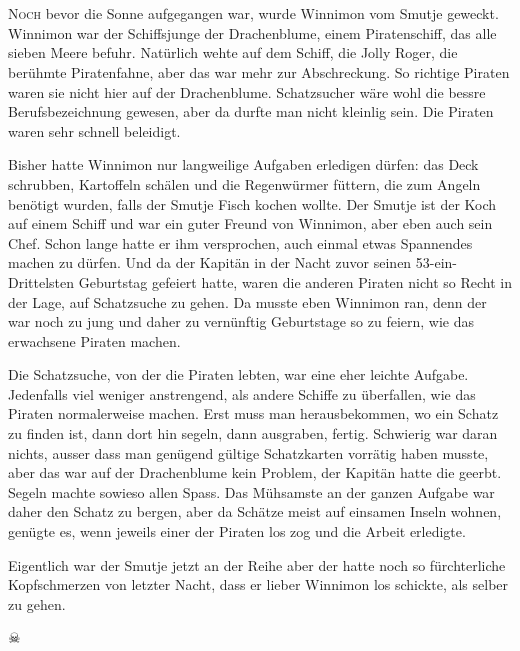 \chapter*{}
\lettrine[lines=3]{\color{red}N}{och} bevor die Sonne aufgegangen war, wurde Winnimon vom Smutje geweckt. Winnimon war der Schiffsjunge der Drachenblume, einem Piratenschiff, das alle sieben Meere befuhr. Natürlich wehte auf dem Schiff, die Jolly Roger, die berühmte Piratenfahne, aber das war mehr zur Abschreckung. So richtige Piraten waren sie nicht hier auf der Drachenblume. Schatzsucher wäre wohl die bessre Berufsbezeichnung gewesen, aber da durfte man nicht kleinlig sein. Die Piraten waren sehr schnell beleidigt.

Bisher hatte Winnimon nur langweilige Aufgaben erledigen dürfen: das Deck schrubben, Kartoffeln schälen und die Regenwürmer füttern, die zum Angeln benötigt wurden, falls der Smutje Fisch kochen wollte. Der Smutje ist der Koch auf einem Schiff und war ein guter Freund von Winnimon, aber eben auch sein Chef. Schon lange hatte er ihm versprochen, auch einmal etwas Spannendes machen zu dürfen. Und da der Kapitän in der Nacht zuvor seinen 53-ein-Drittelsten Geburtstag gefeiert hatte, waren die anderen Piraten nicht so Recht in der Lage, auf Schatzsuche zu gehen. Da musste eben Winnimon ran, denn der war noch zu jung und daher zu vernünftig Geburtstage so zu feiern, wie das erwachsene Piraten machen.

Die Schatzsuche, von der die Piraten lebten, war eine eher leichte Aufgabe. Jedenfalls viel weniger anstrengend, als andere Schiffe zu überfallen, wie das Piraten normalerweise machen. Erst muss man herausbekommen, wo ein Schatz zu finden ist, dann dort hin segeln, dann ausgraben, fertig. Schwierig war daran nichts, ausser dass man genügend gültige Schatzkarten vorrätig haben musste, aber das war auf der Drachenblume kein Problem, der Kapitän hatte die geerbt. Segeln machte sowieso allen Spass. Das Mühsamste an der ganzen Aufgabe war daher den Schatz zu bergen, aber da Schätze meist auf einsamen Inseln wohnen, genügte es, wenn jeweils einer der Piraten los zog und die Arbeit erledigte.

Eigentlich war der Smutje jetzt an der Reihe aber der hatte noch so fürchterliche Kopfschmerzen von letzter Nacht, dass er lieber Winnimon los schickte, als selber zu gehen.

\begin{center}
{ $\skull$}
\end{center}

